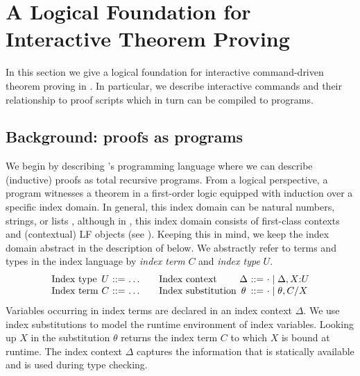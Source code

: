 \chapter{%
  A Logical Foundation for Interactive Theorem Proving%
}
\label{chap:theory}

In this section we give a logical foundation for interactive
command-driven theorem proving in \Beluga{}. In particular, we describe interactive
commands and their relationship to proof scripts which in turn can be
compiled to \Beluga{} programs.


\section{%
  Background:  proofs as programs%
}
\label{sec:beluga}
We begin by describing \Beluga's programming language where we can
describe (inductive) proofs as total recursive programs.
From a logical perspective, a \Beluga{} program witnesses a theorem in a
first-order logic equipped with induction over a specific index domain.
In general, this index domain can be natural numbers, strings, or lists
\cite{ChH03Pha,Xi:POPL03}, although in \Beluga{}, this index domain
consists of first-class contexts and (contextual) LF objects (see
\cite{Cave:POPL12}).
Keeping this in mind, we keep the index domain abstract in the
description of \Beluga{} below. We abstractly refer to terms and types
in the index language by \emph{index term} $C$ and \emph{index type}
$U$.
%
\[
  \begin{array}{l@{~}c@{~}r@{~}l@{~~~~~~}l@{~}c@{~}r@{~}l}
  \mbox{Index type} & U & ::= & \ldots  &
    \mbox{Index context} & {\Delta} & ::= & {\cdot \galt \Delta, X{:}U}\\
  \mbox{Index term} & {C} & ::= & {\ldots}    &
    \mbox{Index substitution} & {\theta} & ::= & {\cdot \galt \theta, C/X}
  \end{array}
\]
%
Variables occurring in index terms are declared in an index context
$\Delta$. We use index substitutions to model the runtime environment of index
variables. Looking up $X$ in the substitution $\theta$ returns the
index term $C$ to which $X$ is bound at runtime. The index context
$\Delta$ captures the information that is statically available and is
used during type checking.

